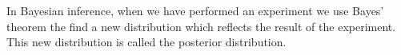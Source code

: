 In Bayesian inference, when we have performed an experiment we use Bayes' theorem
the find a new distribution which reflects the result of the experiment.
This new distribution is called the posterior distribution.